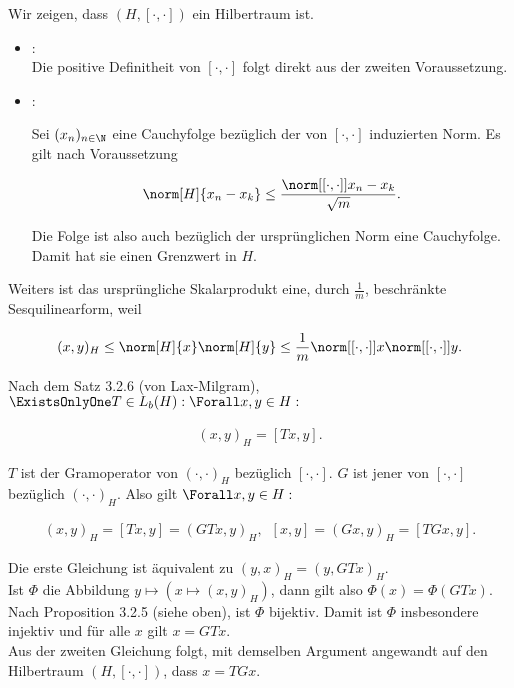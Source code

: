 \begin{solution}

Wir zeigen, dass $(H, [\cdot, \cdot])$ ein Hilbertraum ist.

\begin{itemize}

  \item
  : \\

  Die positive Definitheit von $[\cdot, \cdot]$ folgt direkt aus der zweiten Voraussetzung. \\

  \item
  :

  Sei $(x_n)_{n \in \N}$ eine Cauchyfolge bezüglich der von $[\cdot, \cdot]$ induzierten Norm.
  Es gilt nach Voraussetzung

  \begin{align*}
      \norm[H]{x_n - x_k}
      \leq
      \frac
      {
        \norm[{[\cdot, \cdot]}]{x_n - x_k}
      }{
        \sqrt{m}
      }.
  \end{align*}

  Die Folge ist also auch bezüglich der ursprünglichen Norm eine Cauchyfolge.
  Damit hat sie einen Grenzwert in $H$.

\end{itemize}

Weiters ist das ursprüngliche Skalarprodukt eine, durch $\frac{1}{m}$, beschränkte Sesquilinearform, weil

\begin{align*}
  (x, y)_H
  \leq
  \norm[H]{x} \norm[H]{y}
  \leq
  \frac{1}{m} \norm[{[\cdot, \cdot]}]{x} \norm[{[\cdot, \cdot]}]{y}.
\end{align*}


Nach dem Satz 3.2.6 (von Lax-Milgram), $\ExistsOnlyOne T \in L_b(H): \Forall x, y \in H:$

\begin{align*}
    (x, y)_H = [T x, y].
\end{align*}

$T$ ist der Gramoperator von $(\cdot, \cdot)_H$ bezüglich $[\cdot, \cdot]$.
$G$ ist jener von $[\cdot, \cdot]$ bezüglich $(\cdot, \cdot)_H$.
Also gilt $\Forall x, y \in H:$

\begin{align*}
    (x, y)_H = [T x, y] = (G T x, y)_H,
    \enspace
    [x, y] = (G x, y)_H = [T G x, y].
\end{align*}

Die erste Gleichung ist äquivalent zu $(y, x)_H = (y, GTx)_H$. \\

Ist $\Phi$ die Abbildung $y \mapsto (x \mapsto (x, y)_H)$, dann gilt also $\Phi(x) = \Phi(GTx)$.
Nach Proposition 3.2.5 (siehe oben), ist $\Phi$ bijektiv.
Damit ist $\Phi$ insbesondere injektiv und für alle $x$ gilt $x = GTx$. \\

Aus der zweiten Gleichung folgt, mit demselben Argument angewandt auf den Hilbertraum $(H, [\cdot, \cdot])$, dass $x = T G x.$

\end{solution}
